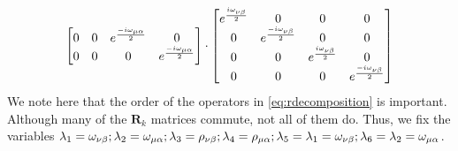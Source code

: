 \documentclass{aux/ttuthes2007}
\newcommand{\ind}[1]{{\uo #1 \oo #1}}
\newcommand{\uo}[1]{
		\IfEqCase{#1}{
			{0}{\mu}
			{1}{\nu}
			{2}{\xi}
		}[\PackageError{uo}{Undefined option to uo: #1}{}]
}
\newcommand{\oo}[1]{
		\IfEqCase{#1}{
			{0}{\alpha}
			{1}{\beta}
			{2}{\gamma}
		}[\PackageError{unocorb}{Undefined option to unuo: #1}{}]
}
\begin{document}
\begin{equation}
\begin{split}
\begin{bmatrix}
		0 & 0 & e^{\frac{-i \omega_\ind 0} 2 } & 0 \\
		0 & 0 & 0 & e^{\frac{-i \omega_\ind 0} 2 }
	\end{bmatrix}
	\cdot
	\begin{bmatrix}
		e^{\frac{i \omega_\ind 1} 2 } & 0 & 0 & 0 \\
		0 & e^{\frac{-i \omega_\ind 1} 2 } & 0 & 0 \\
		0 & 0 & e^{\frac{i \omega_\ind 1} 2 } & 0 \\
		0 & 0 & 0 & e^{\frac{-i \omega_\ind 1} 2 }
	\end{bmatrix} \\
	\end{split}
\end{equation}
%
We note here that the order of the operators in \ref{eq:rdecomposition} is important. Although many of the $\bm R_k$ matrices commute, not all of them do. Thus, we fix the variables 
$\lambda_1 = \omega_\ind 1; \lambda_2 = \omega_\ind 0; \lambda_3 = \rho_\ind 1; \lambda_4 = \rho_\ind 0; \lambda_5 = \lambda_1 = \omega_\ind 1; \lambda_6 = \lambda_2 = \omega_\ind 0$.
%
%
\end{document}
